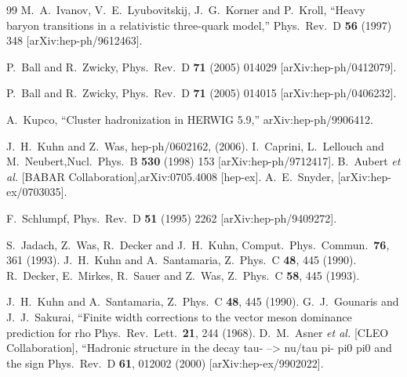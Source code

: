 \documentclass{article}
\begin{document}
\begin{thebibliography}{99}
  M.~A.~Ivanov, V.~E.~Lyubovitskij, J.~G.~Korner and P.~Kroll,
  ``Heavy baryon transitions in a relativistic three-quark model,''
  Phys.\ Rev.\  D {\bf 56} (1997) 348
  [arXiv:hep-ph/9612463].

 P.~Ball and R.~Zwicky, 
Phys.\ Rev.\  D {\bf 71} (2005) 014029 [arXiv:hep-ph/0412079].

 P.~Ball and R.~Zwicky,
 Phys.\ Rev.\  D {\bf 71} (2005) 014015 [arXiv:hep-ph/0406232].

  A.~Kupco,
  ``Cluster hadronization in HERWIG 5.9,''
  arXiv:hep-ph/9906412.

 J.~H.~Kuhn and Z.~Was, hep-ph/0602162, (2006).
 I.~Caprini, L.~Lellouch and M.~Neubert,Nucl.\ Phys.\  B {\bf 530} (1998) 153 [arXiv:hep-ph/9712417].
 B.~Aubert {\it et al.}  [BABAR Collaboration],arXiv:0705.4008 [hep-ex]. %
 A.~E.~Snyder, [arXiv:hep-ex/0703035].

F.~Schlumpf,
Phys.\ Rev.\  D {\bf 51} (1995) 2262 [arXiv:hep-ph/9409272].

  S.~Jadach, Z.~Was, R.~Decker and J.~H.~Kuhn,
  Comput.\ Phys.\ Commun.\  {\bf 76}, 361 (1993).
  J.~H.~Kuhn and A.~Santamaria,
  Z.\ Phys.\  C {\bf 48}, 445 (1990).
  R.~Decker, E.~Mirkes, R.~Sauer and Z.~Was,
  Z.\ Phys.\  C {\bf 58}, 445 (1993).

  J.~H.~Kuhn and A.~Santamaria,
  Z.\ Phys.\  C {\bf 48}, 445 (1990).
  G.~J.~Gounaris and J.~J.~Sakurai,
   ``Finite width corrections to the vector meson dominance prediction for rho
  Phys.\ Rev.\ Lett.\  {\bf 21}, 244 (1968).
  D.~M.~Asner {\it et al.}  [CLEO Collaboration],
   ``Hadronic structure in the decay tau- --> nu/tau pi- pi0 pi0 and the  sign
  Phys.\ Rev.\  D {\bf 61}, 012002 (2000)
  [arXiv:hep-ex/9902022].


\end{thebibliography}
\end{document}
